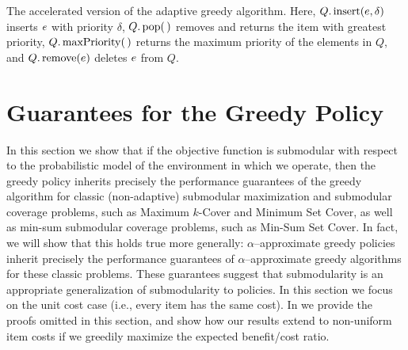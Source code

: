  
\begin{algorithm}
 \label{alg:acc-greedy} 
\caption{The accelerated version of the adaptive greedy
algorithm.  Here, $Q.\operatorname{insert}(e, \delta)$ inserts $e$ with
priority $\delta$,  $Q.\operatorname{pop}(\, )$ removes and returns the
item with greatest priority, $Q.\operatorname{maxPriority}(\, )$ returns the
maximum priority of the elements in $Q$, and $Q.\operatorname{remove}(e)$
deletes $e$ from $Q$.}
\end{algorithm}


%
%
\section{Guarantees for the Greedy Policy} \label{sec:greedy}
%



%
 In this section we show that if the objective function is \term
submodular with respect to the probabilistic model of the
environment in which we operate, then the greedy policy inherits
precisely the performance guarantees of the greedy  
%
algorithm for classic (non-adaptive) submodular maximization and submodular coverage
problems, such as Maximum $k$-Cover and Minimum
Set Cover, as well as min-sum submodular
coverage problems, such as Min-Sum Set Cover.
In fact, we will show that this holds true more generally: 
$\alpha$--approximate greedy policies inherit precisely the performance guarantees of 
$\alpha$--approximate greedy algorithms for these classic problems. These guarantees suggest that \term submodularity is an 
appropriate generalization of submodularity to policies.  In this section
we focus on the unit cost case (i.e., every item has the same cost).  In \appendixA we
provide the proofs omitted in this section, and 
show how our results extend to non-uniform item costs if we greedily
maximize the expected benefit/cost ratio.


